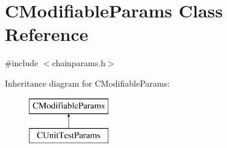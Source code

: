 \hypertarget{class_c_modifiable_params}{}\section{C\+Modifiable\+Params Class Reference}
\label{class_c_modifiable_params}


{\ttfamily \#include $<$chainparams.\+h$>$}

Inheritance diagram for C\+Modifiable\+Params\+:\begin{figure}[H]
\begin{center}
\leavevmode
\includegraphics[height=2.000000cm]{class_c_modifiable_params}
\end{center}
\end{figure}
